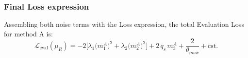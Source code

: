 \subsubsection{Final Loss expression}
Assembling both noise terms with the Loss expression, the total Evaluation Loss for method A is:
\begin{equation}
  \mathcal{L}_{\mathrm{eval}}(\mu_R) = 
  - 2\Big[\lambda_1 \big(m_1^A\big)^2 + \lambda_2 \big(m_2^A\big)^2  \Big] + 2\, q_s\, m_3^A + \frac{2}{\theta_{max}}+ \mathrm{cst}.
\end{equation}

